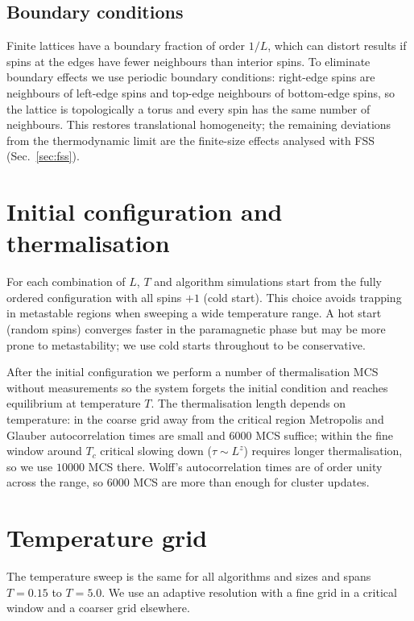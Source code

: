 \subsection{Boundary conditions}

Finite lattices have a boundary fraction of order $1/L$, which can distort results if spins at the edges have fewer neighbours than interior spins. To eliminate boundary effects we use periodic boundary conditions: right-edge spins are neighbours of left-edge spins and top-edge neighbours of bottom-edge spins, so the lattice is topologically a torus and every spin has the same number of neighbours. This restores translational homogeneity; the remaining deviations from the thermodynamic limit are the finite-size effects analysed with FSS (Sec.~\ref{sec:fss}).

\section{Initial configuration and thermalisation}

For each combination of $L$, $T$ and algorithm simulations start from the fully ordered configuration with all spins $+1$ (cold start). This choice avoids trapping in metastable regions when sweeping a wide temperature range. A hot start (random spins) converges faster in the paramagnetic phase but may be more prone to metastability; we use cold starts throughout to be conservative.

After the initial configuration we perform a number of thermalisation MCS without measurements so the system forgets the initial condition and reaches equilibrium at temperature $T$. The thermalisation length depends on temperature: in the coarse grid away from the critical region Metropolis and Glauber autocorrelation times are small and $6000$ MCS suffice; within the fine window around $T_c$ critical slowing down ($\tau\sim L^z$) requires longer thermalisation, so we use $10000$ MCS there. Wolff's autocorrelation times are of order unity across the range, so $6000$ MCS are more than enough for cluster updates.

\section{Temperature grid}

The temperature sweep is the same for all algorithms and sizes and spans $T=0.15$ to $T=5.0$. We use an adaptive resolution with a fine grid in a critical window and a coarser grid elsewhere.

